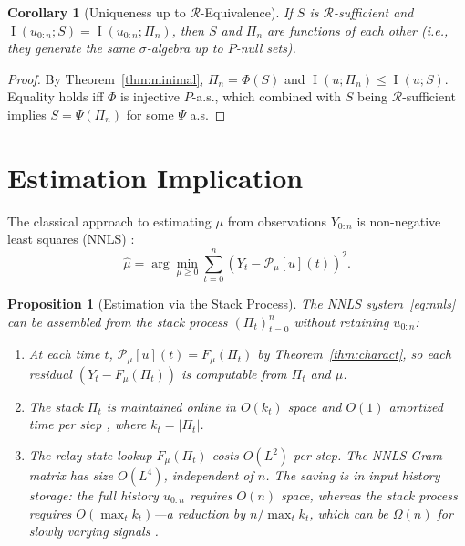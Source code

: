 \documentclass[lettersize,journal]{IEEEtran}
\newtheorem{proposition}[theorem]{Proposition}
\newtheorem{corollary}[theorem]{Corollary}
\newcommand{\cR}{\mathcal{R}}
\newcommand{\stack}{\Pi}
\DeclareMathOperator{\MI}{I}
\begin{document}
\begin{corollary}[Uniqueness up to $\cR$-Equivalence]
\label{cor:unique}
If $S$ is $\cR$-sufficient and
$\MI(u_{0:n};S) = \MI(u_{0:n};\stack_n)$,
then $S$ and $\stack_n$ are functions of each other
(i.e., they generate the same $\sigma$-algebra up to $P$-null sets).
\end{corollary}

\begin{proof}
By Theorem~\ref{thm:minimal}, $\stack_n = \Phi(S)$ and
$\MI(u;\stack_n) \leq \MI(u;S)$.
Equality holds iff $\Phi$ is injective $P$-a.s., which combined
with $S$ being $\cR$-sufficient implies $S = \Psi(\stack_n)$
for some $\Psi$ a.s.
\end{proof}

\section{Estimation Implication}
\label{sec:estimation}

The classical approach to estimating $\mu$ from observations
$Y_{0:n}$ is non-negative least squares (NNLS)
\cite{Mayergoyz1991}:
\begin{equation}
  \hat\mu = \arg\min_{\mu\geq 0}
  \sum_{t=0}^n (Y_t - \mathcal{P}_\mu[u](t))^2.
  \label{eq:nnls}
\end{equation}

\begin{proposition}[Estimation via the Stack Process]
\label{prop:estimation}
The NNLS system~\eqref{eq:nnls} can be assembled from the stack
process $(\stack_t)_{t=0}^n$ without retaining $u_{0:n}$:
\begin{enumerate}
  \item At each time $t$,
    $\mathcal{P}_\mu[u](t) = F_\mu(\stack_t)$ by
    Theorem~\ref{thm:charact}, so each residual
    $(Y_t - F_\mu(\stack_t))$ is computable from $\stack_t$ and
    $\mu$.
  \item The stack $\stack_t$ is maintained online in $O(k_t)$ space
    and $O(1)$ amortized time per step \cite{Frydrych2026WC},
    where $k_t = |\stack_t|$.
  \item The relay state lookup $F_\mu(\stack_t)$ costs $O(L^2)$ per
    step. The NNLS Gram matrix has size $O(L^4)$, independent of
    $n$. The saving is in \emph{input history storage}: the full
    history $u_{0:n}$ requires $O(n)$ space, whereas the stack
    process requires $O(\max_t k_t)$---a reduction by
    $n/\max_t k_t$, which can be $\Omega(n)$ for slowly varying
    signals \cite{Frydrych2026WC}.
\end{enumerate}
\end{proposition}
\end{document}

